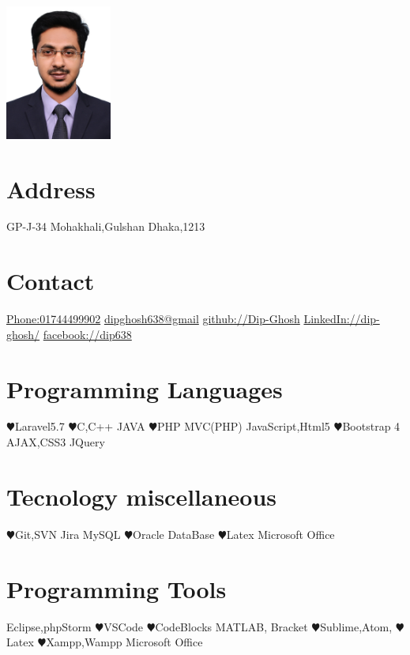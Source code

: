 \documentclass[]{cv-style}
\begin{document}
\begin{aside}
\section{ }
\includegraphics[width=3.5cm]{Dip.jpg}
\section{Address}
    GP-J-34
    Mohakhali,Gulshan
    Dhaka,1213
\section{Contact}
\href{Phone:+8801744499902}{Phone:01744499902}
\href{mail:dipghosh638@gmail.com}{dipghosh638@gmail}
\href{Github:https://github.com/Dip-Ghosh}{github://Dip-Ghosh}
\href{LinkedIn:https://www.linkedin.com/in/dip-ghosh-54b5aba3/}{LinkedIn://dip-ghosh/}
\href{http://facebook.com/dip638}{facebook://dip638}
\section{Programming
   Languages}
{\color{red} $\varheartsuit$}Laravel5.7
 {\color{red} $\varheartsuit$}C,C++
 JAVA
{\color{red} $\varheartsuit$}PHP
MVC(PHP)
JavaScript,Html5
 {\color{red} $\varheartsuit$}Bootstrap 4
AJAX,CSS3
JQuery
~
\section{Tecnology miscellaneous }
 {\color{red} $\varheartsuit$}Git,SVN
 Jira
 MySQL
 {\color{red} $\varheartsuit$}Oracle DataBase
  {\color{red} $\varheartsuit$}Latex
 Microsoft Office
\section{Programming Tools}
    Eclipse,phpStorm
    {\color{red} $\varheartsuit$}VSCode
    {\color{red} $\varheartsuit$}CodeBlocks
   MATLAB, Bracket
   {\color{red} $\varheartsuit$}Sublime,Atom,
   {\color{red} $\varheartsuit$} Latex
    {\color{red} $\varheartsuit$}Xampp,Wampp
    Microsoft Office
\end{aside}
\end{document}
